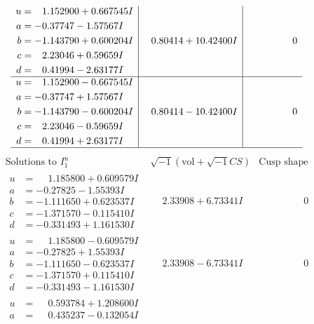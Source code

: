 \documentclass[1p]{elsarticle_modified}
\theoremstyle{definition}
\newcommand{\I}{\sqrt{-1}}
\begin{document}
$$\begin{array}{c|c|c}
\begin{aligned}
u &= \phantom{-}1.152900 + 0.667545 I \\
a &= -0.37747 - 1.57567 I \\
b &= -1.143790 + 0.600204 I \\
c &= \phantom{-}2.23046 + 0.59659 I \\
d &= \phantom{-}0.41994 - 2.63177 I\end{aligned}
 & \phantom{-}0.80414 + 10.42400 I & \phantom{-0.000000 } 0 \\ \hline\begin{aligned}
u &= \phantom{-}1.152900 - 0.667545 I \\
a &= -0.37747 + 1.57567 I \\
b &= -1.143790 - 0.600204 I \\
c &= \phantom{-}2.23046 - 0.59659 I \\
d &= \phantom{-}0.41994 + 2.63177 I\end{aligned}
 & \phantom{-}0.80414 - 10.42400 I & \phantom{-0.000000 } 0\\
 \hline 
 \end{array}$$\newpage$$\begin{array}{c|c|c}  
\text{Solutions to }I^u_{1}& \I (\text{vol} + \sqrt{-1}CS) & \text{Cusp shape}\\
 \hline 
\begin{aligned}
u &= \phantom{-}1.185800 + 0.609579 I \\
a &= -0.27825 - 1.55393 I \\
b &= -1.111650 + 0.623537 I \\
c &= -1.371570 - 0.115410 I \\
d &= -0.331493 + 1.161530 I\end{aligned}
 & \phantom{-}2.33908 + 6.73341 I & \phantom{-0.000000 } 0 \\ \hline\begin{aligned}
u &= \phantom{-}1.185800 - 0.609579 I \\
a &= -0.27825 + 1.55393 I \\
b &= -1.111650 - 0.623537 I \\
c &= -1.371570 + 0.115410 I \\
d &= -0.331493 - 1.161530 I\end{aligned}
 & \phantom{-}2.33908 - 6.73341 I & \phantom{-0.000000 } 0 \\ \hline\begin{aligned}
u &= \phantom{-}0.593784 + 1.208600 I \\
a &= \phantom{-}0.435237 - 0.132054 I \\

\end{aligned}
\end{array}$$
\end{document}
